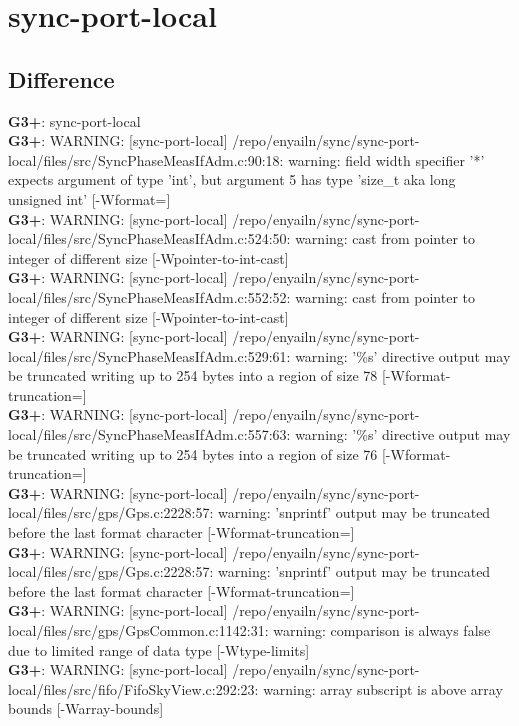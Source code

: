 \documentclass[12pt,twoside]{article}
\begin{document}
\section{sync-port-local} 
\subsection{Difference} 
  
\textbf{G3+}: sync-port-local\\ 
\textbf{G3+}: WARNING: [sync-port-local] /repo/enyailn/sync/sync-port-local/files/src/SyncPhaseMeasIfAdm.c:90:18: warning: field width specifier '*' expects argument of type 'int', but argument 5 has type 'size\_t {aka long unsigned int}' [-Wformat=]\\ 
\textbf{G3+}: WARNING: [sync-port-local] /repo/enyailn/sync/sync-port-local/files/src/SyncPhaseMeasIfAdm.c:524:50: warning: cast from pointer to integer of different size [-Wpointer-to-int-cast]\\ 
\textbf{G3+}: WARNING: [sync-port-local] /repo/enyailn/sync/sync-port-local/files/src/SyncPhaseMeasIfAdm.c:552:52: warning: cast from pointer to integer of different size [-Wpointer-to-int-cast]\\ 
\textbf{G3+}: WARNING: [sync-port-local] /repo/enyailn/sync/sync-port-local/files/src/SyncPhaseMeasIfAdm.c:529:61: warning: '\%s' directive output may be truncated writing up to 254 bytes into a region of size 78 [-Wformat-truncation=]\\ 
\textbf{G3+}: WARNING: [sync-port-local] /repo/enyailn/sync/sync-port-local/files/src/SyncPhaseMeasIfAdm.c:557:63: warning: '\%s' directive output may be truncated writing up to 254 bytes into a region of size 76 [-Wformat-truncation=]\\ 
\textbf{G3+}: WARNING: [sync-port-local] /repo/enyailn/sync/sync-port-local/files/src/gps/Gps.c:2228:57: warning: 'snprintf' output may be truncated before the last format character [-Wformat-truncation=]\\ 
\textbf{G3+}: WARNING: [sync-port-local] /repo/enyailn/sync/sync-port-local/files/src/gps/Gps.c:2228:57: warning: 'snprintf' output may be truncated before the last format character [-Wformat-truncation=]\\ 
\textbf{G3+}: WARNING: [sync-port-local] /repo/enyailn/sync/sync-port-local/files/src/gps/GpsCommon.c:1142:31: warning: comparison is always false due to limited range of data type [-Wtype-limits]\\ 
\textbf{G3+}: WARNING: [sync-port-local] /repo/enyailn/sync/sync-port-local/files/src/fifo/FifoSkyView.c:292:23: warning: array subscript is above array bounds [-Warray-bounds]\\ 
\end{document}
